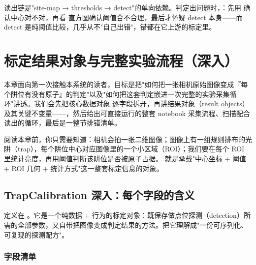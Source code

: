 \documentclass[11pt,oneside,openany]{book}
\begin{document}
\begin{notebox}[排查总原则]
读出链是"site-map → thresholds → detect"的单向依赖。判定出问题时，：先用  确认中心对不对，再看  直方图确认阈值合不合理，最后才怀疑 detect 本身——而 detect 是纯阈值比较，几乎从不"自己出错"，错都在它上游的标定里。
\end{notebox}

\chapter{标定结果对象与完整实验流程（深入）}

本章面向第一次接触本系统的读者，目标是把"如何把一张相机原始图像变成『每个阱位有没有原子』的判定"以及"如何把这套判定嵌进一次完整的实验采集循环"讲透。我们会先把核心数据对象  逐字段拆开，再讲结果对象（result objects）及其关键不变量——，然后给出可直接运行的整套 notebook 采集流程、扫描配合读出的循环，最后是一整节排错清单。

阅读本章前，你只需要知道：相机会拍一张二维图像；图像上有一组规则排布的光阱（trap），每个阱位中心对应图像里的一个小区域（ROI）；我们要在每个 ROI 里统计亮度，再用阈值判断该阱位是否被原子占据。 就是承载"中心坐标 + 阈值 + ROI 几何 + 统计方式"这一整套标定信息的对象。

\section{TrapCalibration 深入：每个字段的含义}

 定义在 。它是一个纯数据 + 行为的标定对象：既保存做点位探测（detection）所需的全部参数，又自带把图像变成判定结果的方法。把它理解成"一份可序列化、可复现的探测配方"。

\subsection{字段清单}
\end{document}
